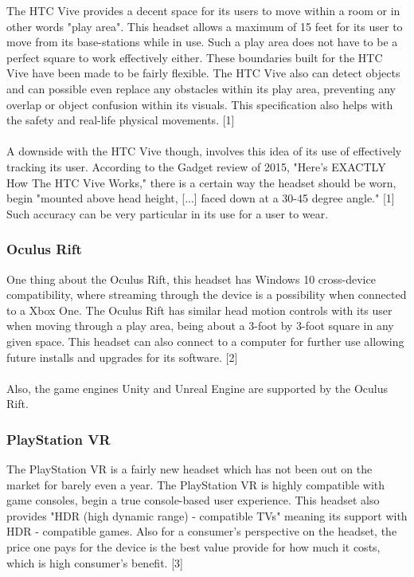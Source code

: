 \documentclass[letterpaper,10pt,onecolumn,compsoc]{IEEEtran}
\begin{document}
\noindent
The HTC Vive provides a decent space for its users to move within a room or in other words "play area". This headset allows a maximum of 15 feet for its user to move from its base-stations while in use. Such a play area does not have to be a perfect square to work effectively either. These boundaries built for the HTC Vive have been made to be fairly flexible. The HTC Vive also can detect objects and can possible even replace any obstacles within its play area, preventing any overlap or object confusion within its visuals. This specification also helps with the safety and real-life physical movements. [1] 
\\ ~ \\
A downside with the HTC Vive though, involves this idea of its use of effectively tracking its user. According to the Gadget review of 2015, "Here's EXACTLY How The HTC Vive Works," there is a certain way the headset should be worn, begin "mounted above head height, [...] faced down at a 30-45 degree angle." [1] Such accuracy can be very particular in its use for a user to wear.

\subsubsection{Oculus Rift}


\noindent
One thing about the Oculus Rift, this headset has Windows 10 cross-device compatibility, where streaming through the device is a possibility when connected to a Xbox One. The Oculus Rift has similar head motion controls with its user when moving through a play area, being about a 3-foot by 3-foot square in any given space. This headset can also connect to a computer for further use allowing future installs and upgrades for its software. [2]
\\ ~ \\
Also, the game engines Unity and Unreal Engine are supported by the Oculus Rift.

\subsubsection{PlayStation VR}


\noindent
The PlayStation VR is a fairly new headset which has not been out on the market for barely even a year. The PlayStation VR is highly compatible with game consoles, begin a true console-based user experience. This headset also provides "HDR (high dynamic range) - compatible TVs" meaning its support  with HDR - compatible games. Also for a consumer's perspective on the headset, the price one pays for the device is the best value provide for how much it costs, which is high consumer's benefit. [3]
\end{document}
